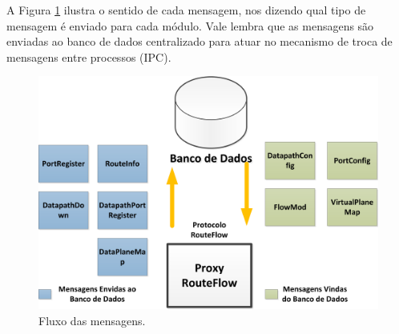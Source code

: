 A Figura \ref{fig:mensagens}
ilustra o sentido de cada mensagem, nos dizendo qual tipo de mensagem
é enviado para cada módulo. Vale lembra que as mensagens
são enviadas ao banco de dados centralizado para atuar no
mecanismo de troca de mensagens entre processos (IPC).
\newline

\begin{figure}[h] 
\centering
\includegraphics[width=140mm]{mensagens.png}
\caption{Fluxo das mensagens.}
\label{fig:mensagens} 
\end{figure}

